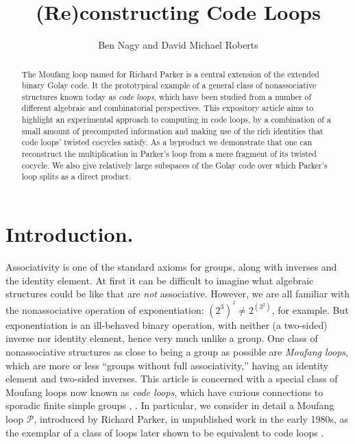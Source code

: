 \documentclass{article}
\theoremstyle{plain}
\theoremstyle{definition}
\def \cP {\mathcal{P}}
\begin{document}
\title{(Re)constructing Code Loops}
\author{Ben Nagy and David Michael Roberts}

\maketitle

\begin{abstract}
The Moufang loop named for Richard Parker is a central extension of the extended binary Golay code. 
It the prototypical example of a general class of nonassociative structures known today as \emph{code loops}, which have been studied from a number of different algebraic and combinatorial perspectives.
This expository article aims to highlight an experimental approach to computing in code loops, by a combination of a small amount of precomputed information and making use of the rich identities that code loops' twisted cocycles satisfy.
As a byproduct we demonstrate that one can reconstruct the multiplication in Parker's loop from a mere fragment of its twisted cocycle. 
We also give relatively large subspaces of the Golay code over which Parker's loop splits as a direct product.
\end{abstract}


\section{Introduction.}

Associativity is one of the standard axioms for groups, along with inverses and the identity element.
At first it can be difficult to imagine what algebraic structures could be like that are \emph{not} associative. 
However, we are all familiar with the nonassociative operation of exponentiation:  $(2^3)^{\!{}^2} \neq 2^{(3^2)}$, for example.
But exponentiation is an ill-behaved binary operation, with neither (a two-sided) inverse nor identity element, hence very much unlike a group. 
One class of nonassociative structures as close to being a group as possible are \emph{Moufang loops}, which are more or less ``groups without full associativity,'' having an identity element and two-sided inverses.
This article is concerned with a special class of Moufang loops now known as \emph{code loops}, which have curious connections to sporadic finite simple groups \cite{Conway}, \cite[\S 7]{Griess87}.
In particular, we consider in detail a Moufang loop $\cP$, introduced by Richard Parker, in unpublished work in the early 1980s, as the exemplar of a class of loops later shown to be equivalent to code loops \cite{Griess}.
\end{document}
